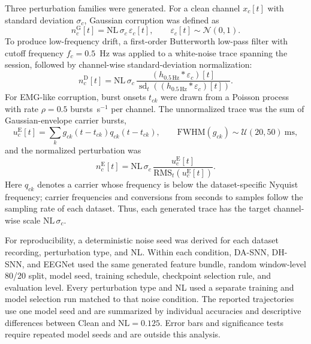 ﻿\documentclass[12pt]{article}
\begin{document}
Three perturbation families were generated. For a clean channel $x_c[t]$ with standard deviation $\sigma_c$, Gaussian corruption was defined as
\begin{equation}
n^{\mathrm{G}}_c[t]=\mathrm{NL}\,\sigma_c\,\varepsilon_c[t],
\qquad \varepsilon_c[t]\sim\mathcal{N}(0,1).
\label{eq:gaussian_perturbation}
\end{equation}
To produce low-frequency drift, a first-order Butterworth low-pass filter with cutoff frequency $f_c=0.5$~Hz was applied to a white-noise trace spanning the session, followed by channel-wise standard-deviation normalization:
\begin{equation}
n^{\mathrm{D}}_c[t]=\mathrm{NL}\,\sigma_c\,
\frac{(h_{0.5\,\mathrm{Hz}}\ast\varepsilon_c)[t]}
{\operatorname{sd}_t\!\left((h_{0.5\,\mathrm{Hz}}\ast\varepsilon_c)[t]\right)}.
\label{eq:drift_perturbation}
\end{equation}
For EMG-like corruption, burst onsets $t_{ck}$ were drawn from a Poisson process with rate $\rho=0.5$ bursts~s$^{-1}$ per channel. The unnormalized trace was the sum of Gaussian-envelope carrier bursts,
\begin{equation}
u^{\mathrm{E}}_c[t]=\sum_k g_{ck}(t-t_{ck})q_{ck}(t-t_{ck}),
\qquad
\mathrm{FWHM}(g_{ck})\sim\mathcal{U}(20,50)~\mathrm{ms},
\label{eq:emg_envelope}
\end{equation}
and the normalized perturbation was
\begin{equation}
n^{\mathrm{E}}_c[t]=\mathrm{NL}\,\sigma_c\,
\frac{u^{\mathrm{E}}_c[t]}{\mathrm{RMS}_t\!\left(u^{\mathrm{E}}_c[t]\right)}.
\label{eq:emg_perturbation}
\end{equation}
Here $q_{ck}$ denotes a carrier whose frequency is below the dataset-specific Nyquist frequency; carrier frequencies and conversions from seconds to samples follow the sampling rate of each dataset. Thus, each generated trace has the target channel-wise scale $\mathrm{NL}\,\sigma_c$.

For reproducibility, a deterministic noise seed was derived for each dataset recording, perturbation type, and NL. Within each condition, DA-SNN, DH-SNN, and EEGNet used the same generated feature bundle, random window-level 80/20 split, model seed, training schedule, checkpoint selection rule, and evaluation level. Every perturbation type and NL used a separate training and model selection run matched to that noise condition. The reported trajectories use one model seed and are summarized by individual accuracies and descriptive differences between Clean and $\mathrm{NL}=0.125$. Error bars and significance tests require repeated model seeds and are outside this analysis.
\end{document}
